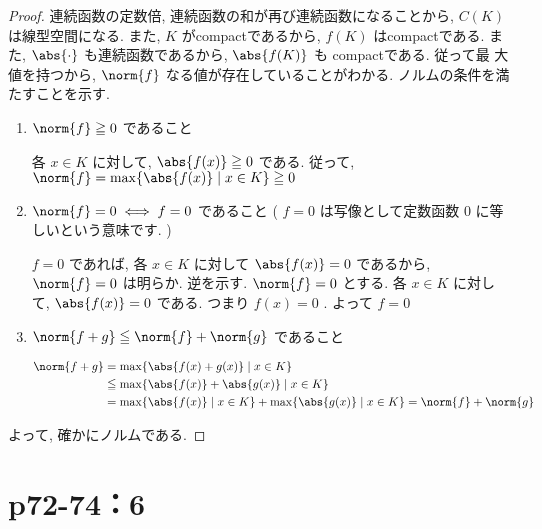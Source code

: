 \documentclass[a4paper,10pt,fleqn]{ltjsarticle}
\begin{document}
\begin{leftbar}
	\begin{proof}
	連続函数の定数倍, 連続函数の和が再び連続函数になることから, $C ( K )$ は線型空間になる. また, $K$ がcompactであるから, $f ( K )$ はcompactである. また, $\abs{ \cdot }$ も連続函数であるから, $\abs{ f ( K ) }$ も compactである. 従って最
	大値を持つから, $\norm{ f }$ なる値が存在していることがわかる. ノルムの条件を満たすことを示す. 
		\begin{enumerate}
			\item $\norm{ f } \geq 0$ であること
				
				\zw 各 $x \in K$ に対して, $\abs{f ( x ) } \geq 0$ である. 従って, $\norm{ f } = \max \{ \abs{ f ( x )} \mid x \in K \} \geq 0$
				
			\item $\norm{ f } = 0 \iff  f = 0$ であること ( $f = 0$ は写像として定数函数 $0$ に等しいという意味です. )	
				
				$f = 0$ であれば, 各 $x \in K$ に対して $\abs{ f ( x ) } = 0$ であるから, $\norm{ f } = 0$ は明らか. 逆を示す. $\norm{ f } = 0$ とする. 各 $x \in K$ に対して, $\abs{ f ( x ) } = 0$ である. つまり $f ( x ) = 0$ . よって $f = 0$
				
			\item $\norm{ f + g } \leq \norm{ f } + \norm{ g }$ であること
			
				\begin{align*}
					\norm{ f + g } & =  \max \{ \abs{ f ( x ) + g ( x )} \mid x \in K \} \\
					& \leq  \max \{ \abs{ f ( x ) } + \abs{ g ( x ) } \mid x \in K \} \\
					& =  \max \{ \abs{ f ( x ) }  \mid x \in K \} + \max \{ \abs{ g ( x ) }  \mid x \in K \} = \norm{ f } + \norm{ g }
				\end{align*}
		\end{enumerate}
	よって, 確かにノルムである. 
\end{proof}
\end{leftbar}
\newpage

\section*{p72-74：6}
\end{document}
